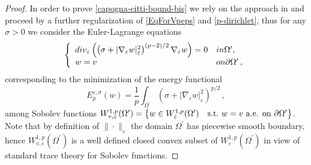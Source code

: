 \documentclass[10pt]{amsart}
\numberwithin{equation}{section}
\theoremstyle{definition}
\begin{document}
\begin{proof}
In order to prove \eqref{capogna-citti-bound-bis} we rely on the approach in \cite{CapoCitti4} and proceed by a further regularization of \eqref{EqForVpeps} and  \eqref{p-dirichlet}, thus for any $\sigma>0$ we consider the Euler-Lagrange equations
\begin{equation}\label{EqFor-sigmaVpeps}
\left\{ \begin{array}{ll}
            {\rm div}_ \varepsilon \left(  \left( \sigma+| \nabla_\varepsilon w |^2_\varepsilon \right)^{(p-2)/2} \nabla_\varepsilon w \right) = 0 & \textrm{in } \Omega^\prime,\\
						w= v & \textrm{on } \partial \Omega^\prime \, ,
        \end{array}\right.
\end{equation}
corresponding to the minimization of the energy functional
\begin{equation}
\label{sigma-p-energy}
E^{\varepsilon,\sigma}_p (w)=\frac{1}{p} \int_{\Omega^\prime} \left( \sigma+| \nabla_\varepsilon w|^2_\varepsilon \right)^{p/2} \, ,
\end{equation}
among Sobolev functions $W^{1,p}_{v,\varepsilon}(\Omega^\prime)= \left\{  w \in W^{1,p}_\varepsilon (\Omega^\prime) \quad \hbox{s.t.} \, \, w =v  \, \, \hbox{a.e. on} \, \, \partial \Omega^\prime \right\}$.
Note that by definition of $\| \cdot \|_\varepsilon$ the domain $\Omega^\prime$ has piecewise smooth boundary, hence $W^{1,p}_{v,\varepsilon}(\Omega^\prime)$ is a well defined closed convex subset of $W^{1,p}_\varepsilon (\Omega^\prime)$ in view of standard trace theory for Sobolev functions.


\end{proof}
\end{document}

